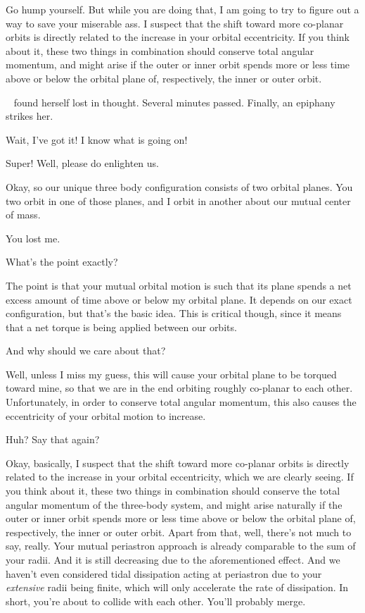 \documentclass[main.tex]{subfiles}
\begin{document}
\newpara \Celaeno Go hump yourself.  But while you are doing that, I am going to try to figure out a way to save your miserable ass.  I suspect that the shift toward more co-planar orbits is directly related to the increase in your orbital eccentricity.  If you think about it, these two things in combination should conserve total angular momentum, and might arise if the outer or inner orbit spends more or less time above or below the orbital plane of, respectively, the inner or outer orbit.

\newpara \nar \rmcelaeno~ found herself lost in thought.  Several minutes passed.  Finally, an epiphany strikes her.

\newpara \Celaeno  Wait, I've got it!  I know what is going on!

\newpara \Taygete  Super!  Well, please do enlighten us.

\newpara \Celaeno  Okay, so our unique three body configuration consists of two orbital planes.  You two orbit in one of those planes, and I orbit in another about our mutual center of mass.

\newpara \Alcyone  You lost me.

\newpara \Taygete What's the point exactly?

\newpara \Celaeno The point is that your mutual orbital motion is such that its plane spends a net excess amount of time above or below my orbital plane.  It depends on our exact configuration, but that's the basic idea.  This is critical though, since it means that a net torque is being applied between our orbits.

\newpara \Alcyone And why should we care about that?

\newpara \Celaeno Well, unless I miss my guess, this will cause your orbital plane to be torqued toward mine, so that we are in the end orbiting roughly co-planar to each other.  Unfortunately, in order to conserve total angular momentum, this also causes the eccentricity of your orbital motion to increase.  

\newpara \Taygete  Huh?  Say that again?

\newpara \Celaeno Okay, basically, I suspect that the shift toward more co-planar orbits is directly related to the increase in your orbital eccentricity, which we are clearly seeing.  If you think about it, these two things in combination should conserve the total angular momentum of the three-body system, and might arise naturally if the outer or inner orbit spends more or less time above or below the orbital plane of, respectively, the inner or outer orbit.  Apart from that, well, there's not much to say, really.  Your mutual periastron approach is already comparable to the sum of your radii.  And it is still decreasing due to the aforementioned effect.  And we haven't even considered tidal dissipation acting at periastron due to your \textit{extensive} radii being finite, which will only accelerate the rate of dissipation.  In short, you're about to collide with each other.  You'll probably merge.
\end{document}
